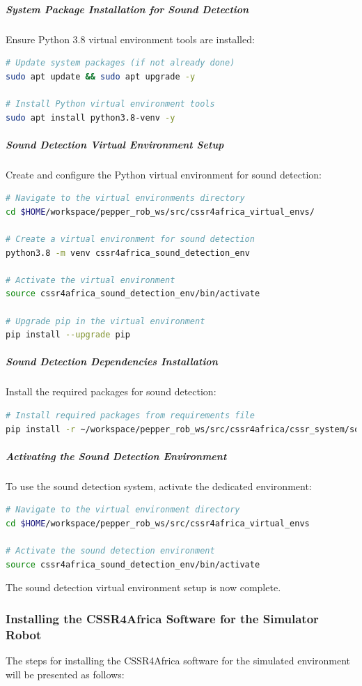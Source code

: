 \documentclass{CSSRforAfrica}
\begin{document}
{\subparagraph{System Package Installation for Sound Detection}
Ensure Python 3.8 virtual environment tools are installed:
\begin{lstlisting}[style=withoutNumbering, language=bash]
# Update system packages (if not already done)
sudo apt update && sudo apt upgrade -y

# Install Python virtual environment tools
sudo apt install python3.8-venv -y
\end{lstlisting}

\subparagraph{Sound Detection Virtual Environment Setup}
Create and configure the Python virtual environment for sound detection:
\begin{lstlisting}[style=withoutNumbering, language=bash]
# Navigate to the virtual environments directory
cd $HOME/workspace/pepper_rob_ws/src/cssr4africa_virtual_envs/

# Create a virtual environment for sound detection
python3.8 -m venv cssr4africa_sound_detection_env

# Activate the virtual environment
source cssr4africa_sound_detection_env/bin/activate

# Upgrade pip in the virtual environment
pip install --upgrade pip
\end{lstlisting}

\subparagraph{Sound Detection Dependencies Installation}
Install the required packages for sound detection:
\begin{lstlisting}[style=withoutNumbering, language=bash]
# Install required packages from requirements file
pip install -r ~/workspace/pepper_rob_ws/src/cssr4africa/cssr_system/sound_detection/sound_detection_requirements.txt
\end{lstlisting}

\subparagraph{Activating the Sound Detection Environment}
To use the sound detection system, activate the dedicated environment:
\begin{lstlisting}[style=withoutNumbering, language=bash]
# Navigate to the virtual environment directory
cd $HOME/workspace/pepper_rob_ws/src/cssr4africa_virtual_envs

# Activate the sound detection environment
source cssr4africa_sound_detection_env/bin/activate
\end{lstlisting}

The sound detection virtual environment setup is now complete.

\subsubsection{Installing the CSSR4Africa Software for the Simulator Robot}
\label{sim-soft}
The steps for installing the CSSR4Africa software for the simulated environment will be presented as follows:

}
\end{document}
